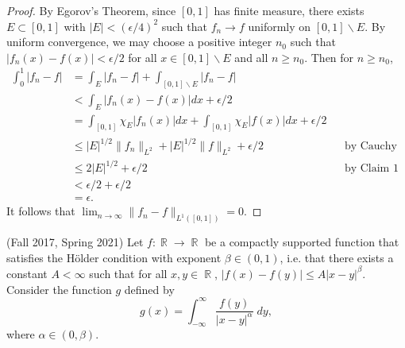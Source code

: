 \documentclass[answers]{exam}
\DeclareMathOperator{\RR}{\mathbb{R}}
\begin{document}
\begin{questions}
\begin{solution}
\begin{proof}
  By Egorov's Theorem, since $[0,1]$ has finite measure, there exists $E\subset [0,1]$ with $|E|<(\epsilon/4)^{2}$ such that $f_{n}\to f$ uniformly on $[0,1]\backslash E$. By uniform convergence, we may choose a positive integer $n_{0}$ such that $\left| f_{n}(x)-f(x) \right|< \epsilon/2$ for all $x\in [0,1]\backslash E$ and all $n\geq n_{0}$. Then for $n\geq n_{0}$,
  \begin{align*}
    \int_{0}^{1}\left| f_{n}-f \right|
    &= \int_{E} |f_{n}-f| + \int_{[0,1]\backslash E} |f_{n}-f|\\
    &< \int_{E} |f_{n}(x)-f(x)|dx + \epsilon/2\\
    &= \int_{[0,1]} \chi_{E}|f_{n}(x)|dx  + \int_{[0,1]}\chi_{E}|f(x)|dx + \epsilon/2 \\
    &\leq |E|^{1/2}\| f_{n} \|_{L^{2}}+ |E|^{1/2} \| f \|_{L^{2}} + \epsilon/2 &&\text{by Cauchy Schwarz}\\
    &\leq 2 |E|^{1/2}+ \epsilon/2 &&\text{by Claim 1}\\
    &< \epsilon/2+\epsilon/2\\
    &=\epsilon.
  \end{align*}
  It follows that $\lim_{n \to \infty} \| f_{n}-f \|_{L^{1}([0,1])}=0$.
\end{proof}
\end{solution}


\question (Fall 2017, Spring 2021) Let $f: \RR \to \RR$ be a compactly supported function that satisfies the H\"{o}lder condition with exponent $\beta \in (0,1)$, i.e. that there exists a constant $A < \infty$ such that for all $x,y \in \RR$, $|f(x) - f(y)| \leq A|x-y|^\beta$. Consider the function $g$ defined by
%
\[ g(x) = \int_{-\infty}^\infty \frac{f(y)}{|x-y|^\alpha}\; dy, \]
%
where $\alpha \in (0,\beta)$.
%
\begin{parts}

\end{parts}
\end{questions}
\end{document}
